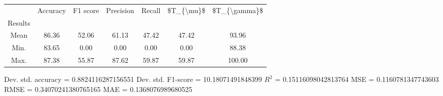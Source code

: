 \begin{tabular}{|c|c|c|c|c|c|c|}
\toprule
{} &  Accuracy &  F1 score &  Precision &  Recall &  \$T\_\{\textbackslash mu\}\$ &  \$T\_\{\textbackslash gamma\}\$ \\
Results &           &           &            &         &            &               \\
\hline
Mean    &     86.36 &     52.06 &      61.13 &   47.42 &      47.42 &         93.96 \\
Min.    &     83.65 &      0.00 &       0.00 &    0.00 &       0.00 &         88.38 \\
Max.    &     87.38 &     55.87 &      87.62 &   59.87 &      59.87 &        100.00 \\
\bottomrule
\end{tabular}

 Dev. std. accuracy = 0.8824116287156551
 Dev. std. F1-score = 10.18071491848399
 $R^2$ = 0.15116098042813764
 MSE = 0.1160781347743603
 RMSE = 0.34070241380765165
 MAE = 0.1368076989680525